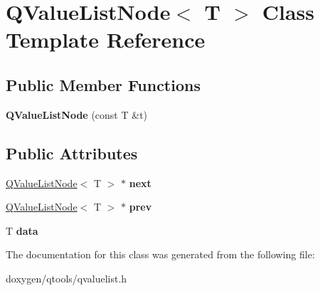 \hypertarget{class_q_value_list_node}{}\section{Q\+Value\+List\+Node$<$ T $>$ Class Template Reference}
\label{class_q_value_list_node}
\subsection*{Public Member Functions}
\begin{DoxyCompactItemize}
\item 
\mbox{\label{class_q_value_list_node_a414708bcc6bc42146b35152e149fd2e5}} 
{\bfseries Q\+Value\+List\+Node} (const T \&t)
\end{DoxyCompactItemize}
\subsection*{Public Attributes}
\begin{DoxyCompactItemize}
\item 
\mbox{\label{class_q_value_list_node_a1245a38c5c472b6867add6bfac379ff2}} 
\mbox{\hyperlink{class_q_value_list_node}{Q\+Value\+List\+Node}}$<$ T $>$ $\ast$ {\bfseries next}
\item 
\mbox{\label{class_q_value_list_node_a2c968e12a5de6c529ea91cd10116c70c}} 
\mbox{\hyperlink{class_q_value_list_node}{Q\+Value\+List\+Node}}$<$ T $>$ $\ast$ {\bfseries prev}
\item 
\mbox{\label{class_q_value_list_node_a3d4084886185c3f356bbd8e1009c3b7d}} 
T {\bfseries data}
\end{DoxyCompactItemize}


The documentation for this class was generated from the following file\+:\begin{DoxyCompactItemize}
\item 
doxygen/qtools/qvaluelist.\+h\end{DoxyCompactItemize}
